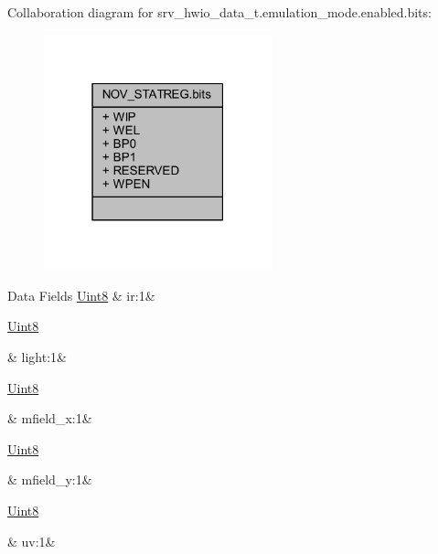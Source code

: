 Collaboration diagram for srv\+\_\+hwio\+\_\+data\+\_\+t.\+emulation\+\_\+mode.\+enabled.\+bits\+:\nopagebreak
\begin{figure}[H]
\begin{center}
\leavevmode
\includegraphics[width=187pt]{d2/d71/a01684}
\end{center}
\end{figure}
\begin{DoxyFields}{Data Fields}
\hypertarget{a00034_ad74eea4899a61f9fcbc527ef988ea0ff}{\hyperlink{a00072_af84840501dec18061d18a68c162a8fa2}{Uint8}}\label{a00034_ad74eea4899a61f9fcbc527ef988ea0ff}
&
ir\+:1&
\\
\hline

\hypertarget{a00034_a2ac43aa43bf473f9a9c09b4b608619d3}{\hyperlink{a00072_af84840501dec18061d18a68c162a8fa2}{Uint8}}\label{a00034_a2ac43aa43bf473f9a9c09b4b608619d3}
&
light\+:1&
\\
\hline

\hypertarget{a00034_a46709d870ad5c3126599a53675c43291}{\hyperlink{a00072_af84840501dec18061d18a68c162a8fa2}{Uint8}}\label{a00034_a46709d870ad5c3126599a53675c43291}
&
mfield\+\_\+x\+:1&
\\
\hline

\hypertarget{a00034_a3f1a98f3682b6c9f001cd31bfa704220}{\hyperlink{a00072_af84840501dec18061d18a68c162a8fa2}{Uint8}}\label{a00034_a3f1a98f3682b6c9f001cd31bfa704220}
&
mfield\+\_\+y\+:1&
\\
\hline

\hypertarget{a00034_a45210da832f9626829457a65e9e7c4d0}{\hyperlink{a00072_af84840501dec18061d18a68c162a8fa2}{Uint8}}\label{a00034_a45210da832f9626829457a65e9e7c4d0}
&
uv\+:1&
\\
\hline

\end{DoxyFields}


